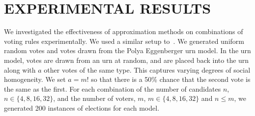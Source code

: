 \documentclass{ecai2012}
\begin{document}
\vspace{-2mm}
\section{EXPERIMENTAL RESULTS}
\vspace{-1mm}



We investigated the effectiveness of approximation
methods on combinations of voting rules experimentally.
We used a similar setup
to~\cite{dknwaaai11}.  We generated
uniform random votes and votes drawn from the Polya
Eggenberger urn model. %
In the urn model,
votes are drawn from an urn at random, and are placed back into
the urn along with $a$ other votes of the same type.  This captures
varying degrees of social homogeneity. We set $a = m!$
so that there is a 50\% chance that the second vote is the same as the
first. For each combination of the number of candidates $n$, $n \in \{4,8,16,32\}$,
and the number of voters, $m$, $ m \in \{4,8,16,32\}$
and $n \leq m$, we generated
200 instances of elections for each model.
\end{document}
